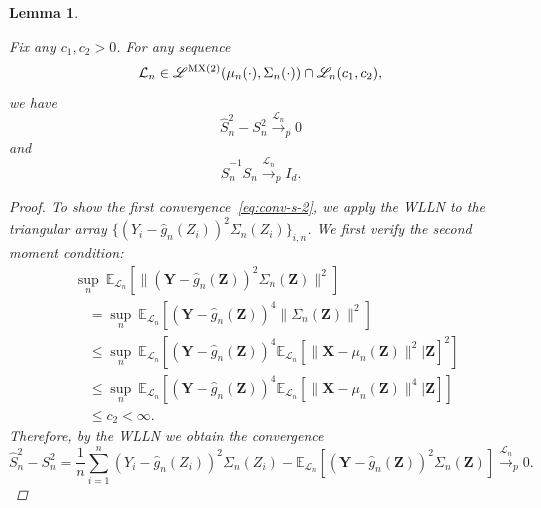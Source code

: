\documentclass[ejs]{imsart}
\numberwithin{equation}{section}
\theoremstyle{plain}
\newtheorem{lemma}{Lemma}
\theoremstyle{definition}
\theoremstyle{remark}
\newcommand{\prx}{\bm X}
\newcommand{\prz}{\bm Z}
\newcommand{\srz}{Z}
\newcommand{\pry}{{\bm Y}}
\newcommand{\sry}{Y}
\begin{document}
\begin{lemma}\label{lem:aux}
	
	Fix any $c_1, c_2 > 0$. For any sequence
	\begin{equation}
		\mathcal L_n \in \mathscr L^{\textnormal{MX(2)}}(\mu_n(\cdot), \Sigma_n(\cdot)) \cap \mathscr L_n(c_1, c_2),
	\end{equation}
	we have
	\begin{equation}
		\widehat S_n^2 - S_n^2 \overset{\mathcal L_n}\rightarrow_p  0
		\label{eq:conv-s-2}
	\end{equation}
	and
	\begin{equation}
		\widehat S_n^{-1}S_n \overset{\mathcal L_n}\rightarrow_p I_d.
		\label{eq:conv-s-neg-1}
	\end{equation}
	
	\begin{proof}
		To show the first convergence~\eqref{eq:conv-s-2}, we apply the WLLN to the triangular array $\{(\sry_{i} - \widehat g_n(\srz_{i}))^2\Sigma_n(\srz_i)\}_{i,n}$. We first verify the second moment condition:
		\begin{equation}
			\begin{split}
				&\sup_{n}\ \mathbb E_{\mathcal L_n}[\|(\pry - \widehat g_n(\prz))^2\Sigma_n(\prz)\|^2] \\
				&\quad= \sup_{n}\ \mathbb E_{\mathcal L_n}[(\pry - \widehat g_n(\prz))^4\|\Sigma_n(\prz)\|^2] \\
				&\quad\leq \sup_{n}\ \mathbb E_{\mathcal L_n}[(\pry - \widehat g_n(\prz))^4\mathbb E_{\mathcal L_n}[\|\prx - \mu_n(\prz)\|^2|\prz]^2] \\
				&\quad\leq \sup_{n}\ \mathbb E_{\mathcal L_n}[(\pry - \widehat g_n(\prz))^4\mathbb E_{\mathcal L_n}[\|\prx - \mu_n(\prz)\|^4|\prz]] \\
				&\quad \leq  c_2 < \infty.
			\end{split}
			\label{eq:eighth-moment-calculation}
		\end{equation} 
		Therefore, by the WLLN we obtain the convergence
		\begin{equation}
			\widehat S_n^{2} - S_n^2 =  \frac{1}{n}\sum_{i = 1}^n (\sry_{i} - \widehat g_n(\srz_{i}))^2\Sigma_n(\srz_i) - \mathbb E_{\mathcal L_n}[(\pry - \widehat g_n(\prz))^2\Sigma_n(\prz)]\overset{\mathcal L_n}\rightarrow_p 0.
		\end{equation}
		

\end{proof}
\end{lemma}
\end{document}
